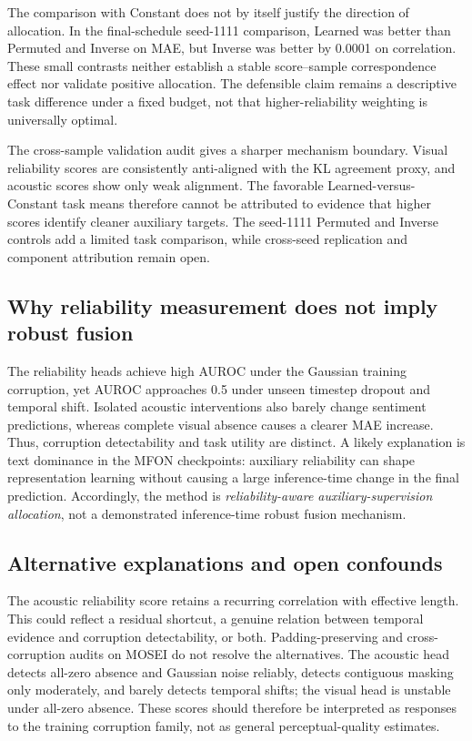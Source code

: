 The comparison with Constant does not by itself justify the direction of
allocation. In the final-schedule seed-1111 comparison,
Learned was better than Permuted and Inverse on MAE, but Inverse was better by
0.0001 on correlation. These small contrasts neither establish a stable
score--sample correspondence effect nor validate positive allocation. The
defensible claim remains a descriptive task difference under a fixed budget,
not that higher-reliability weighting is universally optimal.

The cross-sample validation audit gives a sharper mechanism boundary. Visual
reliability scores are consistently anti-aligned with the KL agreement proxy,
and acoustic scores show only weak alignment. The favorable Learned-versus-Constant
task means therefore cannot be attributed to evidence that higher scores
identify cleaner auxiliary targets. The seed-1111 Permuted and Inverse
controls add a limited task comparison, while cross-seed replication and
component attribution remain open.

\subsection{Why reliability measurement does not imply robust
fusion}\label{why-reliability-measurement-does-not-imply-robust-fusion}

The reliability heads achieve high AUROC under the Gaussian training
corruption, yet AUROC approaches 0.5 under unseen timestep dropout and
temporal shift. Isolated acoustic interventions also barely change sentiment
predictions, whereas complete visual absence causes a clearer MAE increase.
Thus, corruption detectability and task utility are distinct. A likely
explanation is text dominance in the MFON checkpoints: auxiliary reliability
can shape representation learning without causing a large inference-time
change in the final prediction. Accordingly, the method is
\emph{reliability-aware auxiliary-supervision allocation}, not a demonstrated
inference-time robust fusion mechanism.

\subsection{Alternative explanations and open
confounds}\label{alternative-explanations-and-open-confounds}

The acoustic reliability score retains a recurring correlation with
effective length. This could reflect a residual shortcut, a genuine relation
between temporal evidence and corruption detectability, or both.
Padding-preserving and cross-corruption audits on MOSEI do not resolve the
alternatives. The acoustic head detects all-zero absence and Gaussian noise
reliably, detects contiguous masking only moderately, and barely detects
temporal shifts; the visual head is unstable under all-zero absence. These
scores should therefore be interpreted as responses to the training
corruption family, not as general perceptual-quality estimates.

